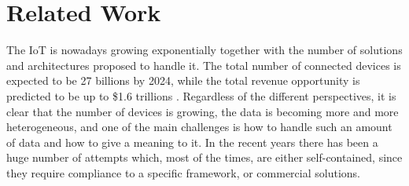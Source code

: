 \section{Related Work}
\label{sec:rel}

The IoT is nowadays growing exponentially together with the number of solutions and architectures proposed to handle it.
The total number of connected devices is expected to be 27 billions by 2024, while the total revenue opportunity is predicted to be up to \$1.6 trillions \cite{machina} .
Regardless of the different perspectives, it is clear that the number of devices is growing, the data is becoming more and more heterogeneous, and one of the main challenges is how to handle such an amount of data and how to give a meaning to it.
In the recent years there has been a huge number of attempts which, most of the times, are either self-contained, since they require compliance to a specific framework, or commercial solutions.
\\

